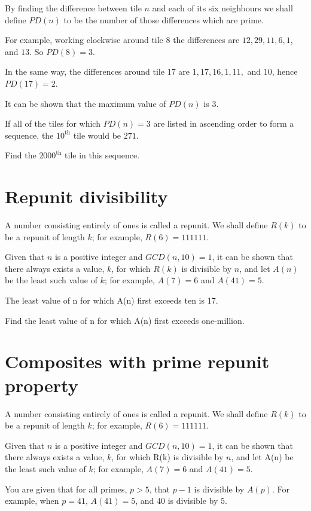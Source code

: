 By finding the difference between tile $n$ and each of its six neighbours we shall define $PD(n)$ to be the number of those differences which are prime.

For example, working clockwise around tile 8 the differences are $12, 29, 11, 6, 1$, and $13$. So $PD(8) = 3$.

In the same way, the differences around tile $17$ are $1, 17, 16, 1, 11,$ and $10$, hence $PD(17) = 2$.

It can be shown that the maximum value of $PD(n)$ is $3$.

If all of the tiles for which $PD(n) = 3$ are listed in ascending order to form a sequence, the $10^{\text{th}}$ tile would be $271$.

Find the $2000^{\text{th}}$ tile in this sequence.


\section{Repunit divisibility} \label{pb.0129}

A number consisting entirely of ones is called a repunit. We shall define $R(k)$ to be a repunit of length $k$; for example, $R(6) = 111111$.

Given that $n$ is a positive integer and $GCD(n, 10) = 1$, it can be shown that there always exists a value, $k$, for which $R(k)$ is divisible by $n$, and let $A(n)$ be the least such value of $k$; for example, $A(7) = 6$ and $A(41) = 5$.

The least value of n for which A(n) first exceeds ten is 17.

Find the least value of n for which A(n) first exceeds one-million.


\section{Composites with prime repunit property} \label{pb.0130}

A number consisting entirely of ones is called a repunit. We shall define $R(k)$ to be a repunit of length $k$; for example, $R(6) = 111111$.

Given that $n$ is a positive integer and $GCD(n, 10) = 1$, it can be shown that there always exists a value, $k$, for which R(k) is divisible by $n$, and let A(n) be the least such value of $k$; for example, $A(7) = 6$ and $A(41) = 5$.

You are given that for all primes, $p > 5$, that $p - 1$ is divisible by $A(p)$. For example, when $p = 41$, $A(41) = 5$, and $40$ is divisible by $5$.

